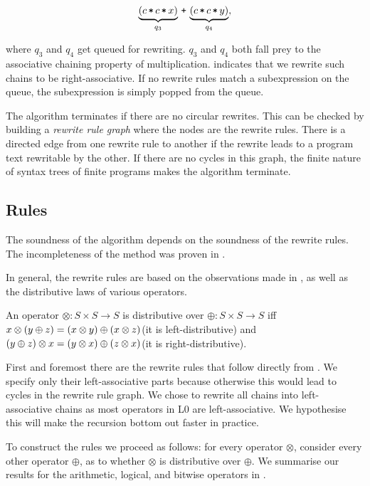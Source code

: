 \[\underbrace{\p{c \lt c \lt x}}_{q_3} \lp \underbrace{\p{c \lt c \lt
y}}_{q_4},\]

where $q_3$ and $q_4$ get queued for rewriting. $q_3$ and $q_4$ both fall prey
to the associative chaining property of multiplication.
 indicates that we rewrite such chains to be
right-associative. If no rewrite rules match a subexpression on the queue, the
subexpression is simply popped from the queue.

The algorithm terminates if there are no circular rewrites. This can be checked
by building a \emph{rewrite rule graph} where the nodes are the rewrite rules.
There is a directed edge from one rewrite rule to another if the rewrite leads
to a program text rewritable by the other. If there are no cycles in this
graph, the finite nature of syntax trees of finite programs makes the algorithm
terminate.

\subsection{Rules}

The soundness of the algorithm depends on the soundness of the rewrite rules.
The incompleteness of the method was proven in . 

In general, the rewrite rules are based on the observations made in
, as well as the distributive laws of various
operators.

An operator $\otimes:S\times S\rightarrow S$ is distributive over
$\oplus:S\times S \rightarrow S$ iff $x \otimes \left({ y \oplus z }\right) = \left({x \otimes
y}\right) \oplus \left({x \otimes z}\right)$(it is left-distributive) and $\left({y \oplus z}\right) \otimes
x = \left({y \otimes x}\right) \oplus \left({z \otimes x}\right)$(it is right-distributive).

First and foremost there are the rewrite rules that follow directly from
. We specify only their left-associative parts because
otherwise this would lead to cycles in the rewrite rule graph. We chose to
rewrite all chains into left-associative chains as most operators in L0 are
left-associative. We hypothesise this will make the recursion bottom out faster
in practice.

To construct the rules we proceed as follows: for every operator $\otimes$,
consider every other operator $\oplus$, as to whether $\otimes$ is distributive
over $\oplus$. We summarise our results for the arithmetic, logical, and
bitwise operators in .

